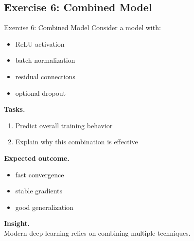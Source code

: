 \documentclass[aspectratio=169,11pt]{beamer}
\begin{document}
\subsection{Exercise 6: Combined Model}
\begin{frame}[t,allowframebreaks]{Exercise 6: Combined Model}
\small
Consider a model with:

\begin{itemize}
    \item ReLU activation
    \item batch normalization
    \item residual connections
    \item optional dropout
\end{itemize}

\textbf{Tasks.}\\ \begin{enumerate}
    \item Predict overall training behavior
    \item Explain why this combination is effective
\end{enumerate}

\textbf{Expected outcome.}\\ \begin{itemize}
    \item fast convergence
    \item stable gradients
    \item good generalization
\end{itemize}

\textbf{Insight.}\\ Modern deep learning relies on combining multiple techniques.
\end{frame}
\end{document}
